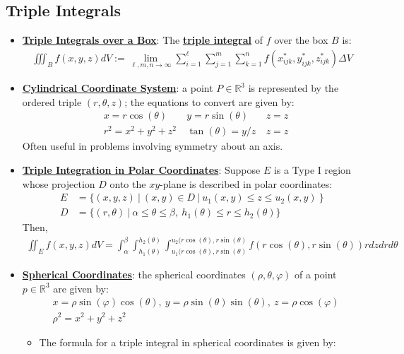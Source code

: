 \documentclass[11pt]{article}
\newcommand{\dfn}[1]{\underline{\textbf{#1}}}
\newcommand{\R}[0]{\mathbb{R}}
\begin{document}
\subsection{Triple Integrals}
\begin{itemize}
	\item \dfn{Triple Integrals over a Box}: The \dfn{triple integral} of $f$ over the box $B$ is: 
	\begin{align}
		\iiint_B f(x,y,z) dV := \lim_{\ell, m, n \rightarrow \infty} \sum_{i=1}^\ell \sum_{j=1}^m \sum_{k=1}^n f(x_{ijk}^*, y_{ijk}^*, z_{ijk}^*) \Delta V	
	\end{align}
	\item \dfn{Cylindrical Coordinate System}: a point $P \in \R^3$ is represented by the ordered triple $(r, \theta, z)$; the equations to convert are given by: 
	\begin{align*}
		& x = r \cos (\theta)\ &  y = r \sin (\theta)\ & z = z \\
		& r^2 = x^2 + y^2 + z^2\	& \tan (\theta) = y/z\ & z = z 
	\end{align*} 
	Often useful in problems involving symmetry about an axis. 
	\item \dfn{Triple Integration in Polar Coordinates}: Suppose $E$ is a Type I region whose projection $D$ onto the $xy$-plane is described in polar coordinates: 
	\begin{align*}
		E & = \{ (x, y, z)\ |\ (x,y) \in D\ |\ u_1(x,y) \leq z \leq u_2(x,y)\ \} \\
		D & = \{ (r, \theta)\ |\ \alpha \leq \theta \leq \beta,\ h_1(\theta) \leq r \leq h_2(\theta) \} 	
	\end{align*}
	Then, 
	\begin{align}
		\iint_E f(x,y,z) dV = \int_\alpha^\beta \int_{h_1(\theta)}^{h_2(\theta)} \int_{u_1(r \cos (\theta), r \sin (\theta) }^{u_2(r \cos (\theta), r \sin (\theta)}	f (r \cos (\theta), r \sin (\theta)) r dz dr d \theta 
	\end{align}
	\item \dfn{Spherical Coordinates}: the spherical coordinates $(\rho, \theta, \varphi)$ of a point $p \in \R^3$ are given by: 
	\begin{align*} 
		& x = \rho \sin (\varphi) \cos (\theta),\ y = \rho \sin (\theta) \sin (\theta),\ z = \rho \cos (\varphi) \\
		& \rho^2 = x^2 + y^2 + z^2 	
	\end{align*} 
	\begin{itemize}[noitemsep]
		\item The formula for a triple integral in spherical coordinates is given by:

\end{itemize}
\end{itemize}
\end{document}
